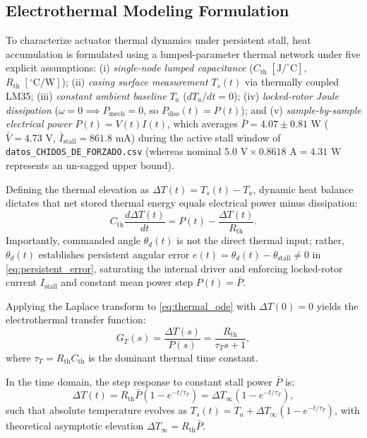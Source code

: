\documentclass[lettersize,journal]{IEEEtran}
\begin{document}
	\subsection{Electrothermal Modeling Formulation}
	\label{sec:thermal_modeling}
	
	To characterize actuator thermal dynamics under persistent stall, heat accumulation is formulated using a lumped-parameter thermal network under five explicit assumptions:
	(i) \textit{single-node lumped capacitance} ($C_{\text{th}}\;[\text{J}/^\circ\text{C}]$, $R_{\text{th}}\;[^\circ\text{C}/\text{W}]$);
	(ii) \textit{casing surface measurement} $T_s(t)$ via thermally coupled LM35;
	(iii) \textit{constant ambient baseline} $T_a$ ($dT_a/dt = 0$);
	(iv) \textit{locked-rotor Joule dissipation} ($\omega = 0 \implies P_{\text{mech}} = 0$, so $P_{\text{diss}}(t) = P(t)$); and
	(v) \textit{sample-by-sample electrical power} $P(t) = V(t)I(t)$, which averages $\bar{P} = 4.07 \pm 0.81\text{ W}$ ($\bar{V} = 4.73\text{ V}$, $\bar{I}_{\text{stall}} = 861.8\text{ mA}$) during the active stall window of \texttt{datos\_CHIDOS\_DE\_FORZADO.csv} (whereas nominal $5.0\text{ V} \times 0.8618\text{ A} = 4.31\text{ W}$ represents an un-sagged upper bound).
	
	Defining the thermal elevation as $\Delta T(t) = T_s(t) - T_a$, dynamic heat balance dictates that net stored thermal energy equals electrical power minus dissipation:
	\begin{equation}
		C_{\text{th}}\frac{d\Delta T(t)}{dt} = P(t) - \frac{\Delta T(t)}{R_{\text{th}}}.
		\label{eq:thermal_ode}
	\end{equation}
	Importantly, commanded angle $\theta_d(t)$ is not the direct thermal input; rather, $\theta_d(t)$ establishes persistent angular error $e(t) = \theta_d(t) - \theta_{\text{stall}} \neq 0$ in \eqref{eq:persistent_error}, saturating the internal driver and enforcing locked-rotor current $I_{\text{stall}}$ and constant mean power step $P(t) = \bar{P}$.
	
	Applying the Laplace transform to \eqref{eq:thermal_ode} with $\Delta T(0) = 0$ yields the electrothermal transfer function:
	\begin{equation}
		G_T(s) = \frac{\Delta T(s)}{P(s)} = \frac{R_{\text{th}}}{\tau_T s + 1},
		\label{eq:transfer_function}
	\end{equation}
	where $\tau_T = R_{\text{th}}C_{\text{th}}$ is the dominant thermal time constant.
	
	In the time domain, the step response to constant stall power $\bar{P}$ is:
	\begin{equation}
		\Delta T(t) = R_{\text{th}}\bar{P}\left(1 - e^{-t/\tau_T}\right) = \Delta T_\infty\left(1 - e^{-t/\tau_T}\right),
		\label{eq:first_order_time}
	\end{equation}
	such that absolute temperature evolves as $T_s(t) = T_a + \Delta T_\infty(1 - e^{-t/\tau_T})$, with theoretical asymptotic elevation $\Delta T_\infty = R_{\text{th}}\bar{P}$.
	
\end{document}

